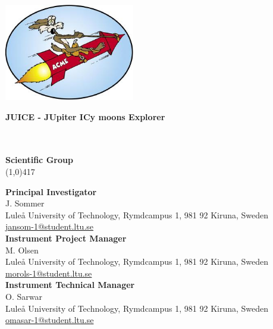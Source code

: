 \begin{titlepage}
\begin{center}
\begin{flushright}
\includegraphics[height=120pt]{Figures/Logo3.jpg}
\end{flushright}
%
\begin{flushleft}
\vspace{5mm}
\Large \bfseries{JUICE - JUpiter ICy moons Explorer}\\
\Large \bfseries{\doctitle}\\ 
\Large \bfseries{\docsubtitle}\\
%
\vspace{15mm}
%
%
%
\begin{normalsize}
%
\textbf{Scientific Group}\\
\vspace{-0.9em}
\line(1,0){417}\\
%
\end{normalsize}
%
\begin{small}
\textbf{Principal Investigator}\\
J. Sommer\\
Lule\r{a} University of Technology, Rymdcampus 1, 981 92 Kiruna, Sweden\\
\href{mailto:jansom-1@student.ltu.se}{jansom-1@student.ltu.se}\\[5mm]
%
\textbf{Instrument Project Manager}\\
M. Olsen\\
Lule\r{a} University of Technology, Rymdcampus 1, 981 92 Kiruna, Sweden\\
\href{mailto:morols-1@student.ltu.se}{morols-1@student.ltu.se}\\[5mm]
%
\textbf{Instrument Technical Manager}\\
O. Sarwar\\
Lule\r{a} University of Technology, Rymdcampus 1, 981 92 Kiruna, Sweden\\
\href{mailto:omasar-1@student.ltu.se}{omasar-1@student.ltu.se}\\
\end{small}

\end{flushleft}
\end{center}
\end{titlepage}
